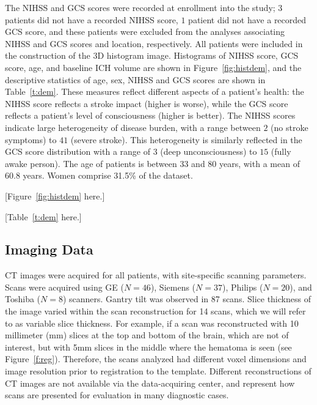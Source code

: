 \documentclass[10pt]{article}\usepackage[]{graphicx}\usepackage[]{color}
\begin{document}
%
                 
The NIHSS and GCS scores were recorded at enrollment into the study; $3$ patients did not have a recorded NIHSS score, $1$ patient did not have a recorded GCS score, and these patients were excluded from the analyses associating NIHSS and GCS scores and location, respectively.  All patients were included in the construction of the 3D histogram image.  Histograms of NIHSS score, GCS score, age, and baseline ICH volume are shown in Figure~\ref{fig:histdem}, and the descriptive statistics of age, sex, NIHSS and GCS scores are shown in Table~\ref{t:dem}. These measures reflect different aspects of a patient's health: the NIHSS score reflects a stroke impact (higher is worse), while the GCS score reflects a patient's level of consciousness (higher is better).  The NIHSS scores indicate large heterogeneity of disease burden, with a range between $2$ (no stroke symptoms) to $41$ (severe stroke).  This heterogeneity is similarly reflected in the GCS score distribution with a range of $3$ (deep unconsciousness) to $15$ (fully awake person). The age of patients is between 33 and 80 years, with a mean of 60.8 years.  Women comprise 31.5\% of the dataset.

[Figure~\ref{fig:histdem} here.]

[Table~\ref{t:dem} here.]



\subsection*{Imaging Data}
CT images were acquired for all patients, with site-specific scanning parameters.  Scans were acquired using GE ($N=46$), Siemens ($N=37$), Philips ($N=20$), and Toshiba ($N=8$) scanners. Gantry tilt was observed in 87 scans.  Slice thickness of the image varied within the scan reconstruction for 14 scans, which we will refer to  as variable slice thickness. For example, if a scan was reconstructed with 10 millimeter (mm) slices at the top and bottom of the brain, which are not of interest, but with 5mm slices in the middle where the hematoma is seen (see Figure~\ref{f:reg}\protect{}).  Therefore, the scans analyzed had different voxel dimensions and image resolution prior to registration to the template.  Different reconstructions of CT images are not available via the data-acquiring center, and represent how scans are presented for evaluation in many diagnostic cases.
\end{document}

